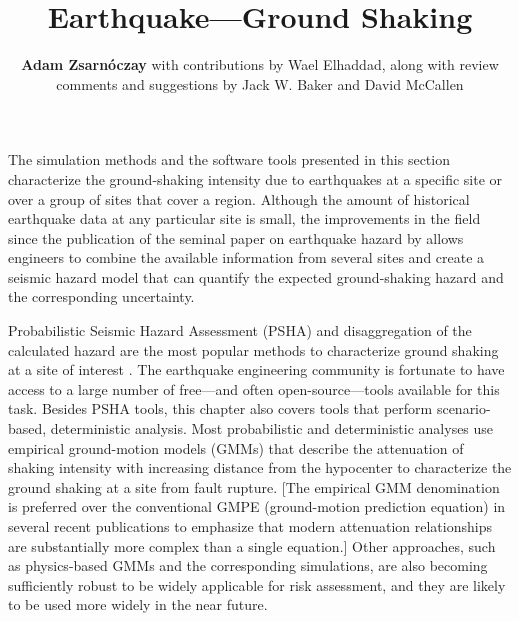 %
%
%

\title{Earthquake---Ground Shaking}
\label{chp:eq_shaking}
\author{
    \textbf{Adam Zsarnóczay}
    with contributions by Wael Elhaddad,
    \newline
    along with review comments and suggestions by Jack W. Baker and David McCallen
}
\tocauthor{}
%
%
\maketitle
\label{chapter:haz_shaking}

The simulation methods and the software tools presented in this section characterize the ground-shaking intensity due to earthquakes at a specific site or over a group of sites that cover a region. Although the amount of historical earthquake data at any particular site is small, the improvements in the field since the publication of the seminal paper on earthquake hazard by \citet{cornell1968engineering} allows engineers to combine the available information from several sites and create a seismic hazard model that can quantify the expected ground-shaking hazard and the corresponding uncertainty. 

Probabilistic Seismic Hazard Assessment (PSHA) and disaggregation of the calculated hazard are the most popular methods to characterize ground shaking at a site of interest \citep{bazzurro1999disaggregation}. The earthquake engineering community is fortunate to have access to a large number of free---and often open-source---tools available for this task. Besides PSHA tools, this chapter also covers tools that perform scenario-based, deterministic analysis. Most probabilistic and deterministic analyses use empirical ground-motion models (GMMs) that describe the attenuation of shaking intensity with increasing distance from the hypocenter to characterize the ground shaking at a site from fault rupture. [The empirical GMM denomination is preferred over the conventional GMPE (ground-motion prediction equation) in several recent publications to emphasize that modern attenuation relationships are substantially more complex than a single equation.] Other approaches, such as physics-based GMMs and the corresponding simulations, are also becoming sufficiently robust to be widely applicable for risk assessment, and they are likely to be used more widely in the near future. 

